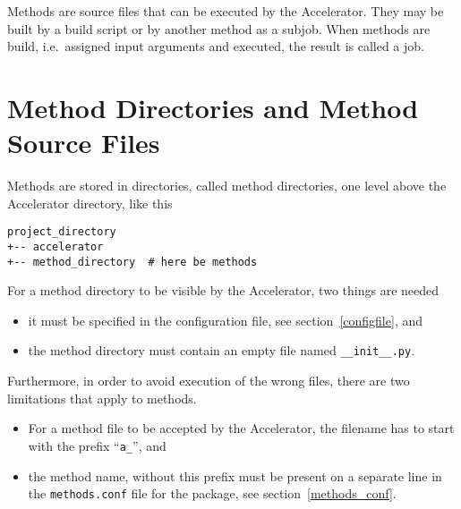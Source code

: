

Methods are source files that can be executed by the Accelerator.
They may be built by a build script or by another method as a subjob.
When methods are build, i.e.\ assigned input arguments and executed,
the result is called a job.


\section{Method Directories and Method Source Files}

Methods are stored in directories, called method directories, one
level above the Accelerator directory, like this
\begin{verbatim}
project_directory
+-- accelerator
+-- method_directory  # here be methods
\end{verbatim}
For a method directory to be visible by the Accelerator, two things are needed
\begin{itemize}
\item it must be specified in the configuration file, see section~\ref{configfile}, and
\item the method directory must contain an empty file named
  \texttt{\_\_init\_\_.py}.
\end{itemize}
Furthermore, in order to avoid execution of the wrong files, there are
two limitations that apply to methods.
\begin{itemize}
\item For a method file to be accepted by the Accelerator, the filename has to start with
  the prefix ``\texttt{a\_}'', and
\item the method name, without this prefix must be present on a
  separate line in the \texttt{methods.conf} file for the package, see
  section~\ref{methods_conf}.
\end{itemize}



